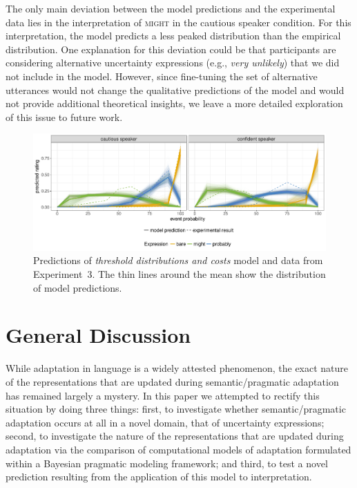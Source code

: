\documentclass[man, floatsintext]{apa6}
\begin{document}
The only main deviation between the model predictions and the experimental data lies in the interpretation of \textsc{might} in the cautious speaker condition. For this interpretation, the model predicts a less peaked distribution than the empirical distribution.  One explanation for this deviation could be that participants are considering alternative uncertainty expressions (e.g., \textit{very unlikely}) that we did not include in the model.  However, since fine-tuning the set of alternative utterances would not change the qualitative predictions of the model and would not provide additional theoretical insights, we leave a more detailed exploration of this issue to future work. 

\begin{figure}
\includegraphics[width=\textwidth]{plots/adaptation-posterior-comp-data.pdf}
\caption{Predictions of \textit{threshold distributions and costs} model and data from Experiment~3. The thin lines around the mean show the distribution of model predictions.  \label{fig:post-exposure-comp-data}}
\end{figure}

\section{General Discussion}

While adaptation in language is a widely attested phenomenon, the exact nature of the representations that are updated during semantic/pragmatic adaptation has remained largely a mystery. In this paper we attempted to rectify this situation by doing three things: first, to investigate whether semantic/pragmatic adaptation occurs at all in a novel domain, that of uncertainty expressions;  second, to investigate the nature of the representations that are updated during adaptation via the comparison of computational models of adaptation formulated within a Bayesian pragmatic modeling framework; and third, to test a novel prediction resulting from the application of this model to interpretation.  
\end{document}
